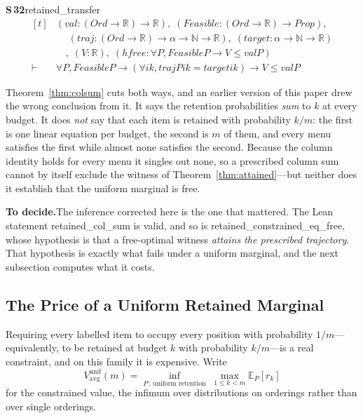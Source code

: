 \documentclass[conference]{IEEEtran}
\theoremstyle{definition}
\newcommand{\lean}[1]{\textsf{\footnotesize #1}}
\newif\ifshownotes\shownotestrue
\newcommand{\TODOPAR}[1]{\ifshownotes\par\vspace{2pt}\noindent%
  {\color{todocol}\textsf{\footnotesize\textbf{To decide.}\;#1}}\par\vspace{2pt}\fi}
\begin{document}
\noindent\textbf{S\,32}\quad\lean{retained\_transfer}
{\footnotesize\[ \begin{aligned}[t]
&(\mathit{val} : (\mathit{Ord} \to \mathbb{R} ) \to \mathbb{R} ),\; (\mathit{Feasible} : (\mathit{Ord} \to \mathbb{R} ) \to \mathit{Prop}),\\
&\quad \; (\mathit{traj} : (\mathit{Ord} \to \mathbb{R} ) \to \alpha \to \mathbb{N} \to \mathbb{R} ),\; (\mathit{target} : \alpha \to \mathbb{N} \to \mathbb{R} )\\
&\quad ,\; (\mathit{V} : \mathbb{R} ),\; (\mathit{hfree} : \forall \mathit{P}, \mathit{Feasible} \mathit{P} \to \mathit{V} \leq \mathit{val} \mathit{P})\\
\vdash\;&\forall \mathit{P}, \mathit{Feasible} \mathit{P} \to (\forall \mathit{i} \mathit{k}, \mathit{traj} \mathit{P} \mathit{i} \mathit{k} = \mathit{target} \mathit{i} \mathit{k}) \to \mathit{V} \leq \mathit{val} \mathit{P}
\end{aligned} \]}


Theorem~\ref{thm:colsum} cuts both ways, and an earlier version of this paper drew the wrong
conclusion from it. It says the retention probabilities \emph{sum} to $k$ at every budget.
It does \emph{not} say that each item is retained with probability $k/m$: the first is one
linear equation per budget, the second is $m$ of them, and every menu satisfies the first
while almost none satisfies the second. Because the column identity holds for every menu it
singles out none, so a prescribed column sum cannot by itself exclude the witness of
Theorem~\ref{thm:attained}---but neither does it establish that the uniform marginal is free.

\TODOPAR{The inference corrected here is the one that mattered. The Lean statement
\lean{retained\_col\_sum} is valid, and so is \lean{retained\_constrained\_eq\_free}, whose
hypothesis is that a free-optimal witness \emph{attains the prescribed trajectory}. That
hypothesis is exactly what fails under a uniform marginal, and the next subsection computes
what it costs.}

\subsection{The Price of a Uniform Retained Marginal}
\label{sec:unifretention}

Requiring every labelled item to occupy every position with probability $1/m$---equivalently,
to be retained at budget $k$ with probability $k/m$---is a real constraint, and on this family
it is expensive. Write
\[
V^{\mathrm{unif}}_{\mathrm{avg}}(m)
=\inf_{P\,:\,\text{uniform retention}}\;\max_{1\le k<m}\mathbb{E}_{P}[r_{k}]
\]
for the constrained value, the infimum over distributions on orderings rather than over
single orderings.
\end{document}
